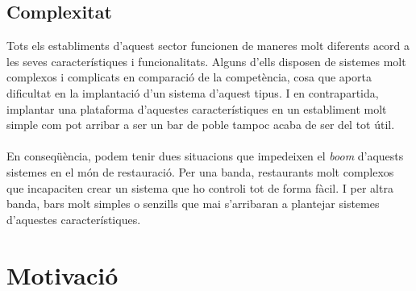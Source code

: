 \newpage
\subsection{Complexitat}

Tots els establiments d'aquest sector funcionen de maneres molt diferents acord a les seves característiques i funcionalitats. Alguns d'ells disposen de sistemes molt complexos i complicats en comparació de la competència, cosa que aporta dificultat en la implantació d'un sistema d'aquest tipus. I en contrapartida, implantar una plataforma d'aquestes característiques en un establiment molt simple com pot arribar a ser un bar de poble tampoc acaba de ser del tot útil.
\\\\
En conseqüència, podem tenir dues situacions que impedeixen el \textit{boom} d'aquests sistemes en el món de restauració. Per una banda, restaurants molt complexos que incapaciten crear un sistema que ho controli tot de forma fàcil. I per altra banda, bars molt simples o senzills que mai s'arribaran a plantejar sistemes d'aquestes característiques.


\section{Motivació}

